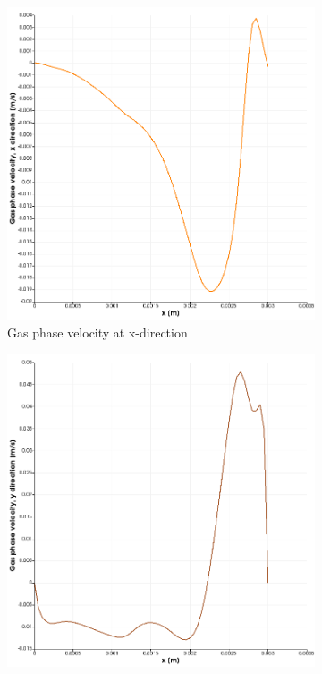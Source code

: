 \begin{figure}
\centering
\begin{subfigure}{.43\textwidth}
  \centering
  \includegraphics[width=1\linewidth]{gasphasevelocityxdirection.png}
  \caption{Gas phase velocity at x-direction}
\end{subfigure}%
\begin{subfigure}{.43\textwidth}
  \centering
  \includegraphics[width=1\linewidth]{gasphasevelocityydirection.png}

\end{subfigure}
\end{figure}
